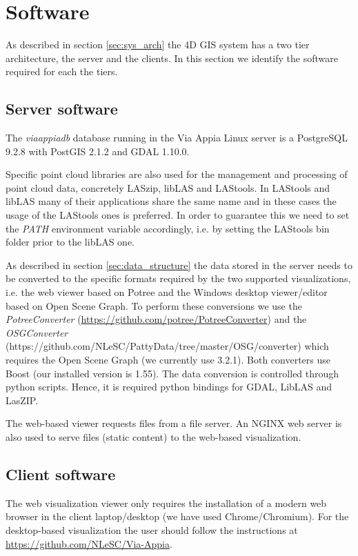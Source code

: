 \section{Software}
\label{sec:software}
As described in section \ref{sec:sys_arch} the 4D GIS system has a two tier
architecture, the server and the clients. In this section we identify the software
required for each the tiers.

\subsection{Server software}
The \textit{viaappiadb} database running in the Via Appia Linux server is a
PostgreSQL 9.2.8 with PostGIS 2.1.2 and GDAL 1.10.0.

Specific point cloud libraries are also used for the management and processing
of point cloud data, concretely LASzip, libLAS and LAStools. In LAStools and
libLAS many of their applications share the same name and in these cases the
usage of the LAStools ones is preferred. In order to guarantee this we need to
set the \textit{PATH} environment variable accordingly, i.e. by setting the
LAStools bin folder prior to the libLAS one.

As described in section \ref{sec:data_structure} the data stored in the server
needs to be converted to the specific formats required by the two supported
visualizations, i.e. the web viewer based on Potree and the Windows desktop
viewer/editor based on Open Scene Graph. To perform these conversions we use
the \textit{PotreeConverter} ({\url{https://github.com/potree/PotreeConverter}}) and
the \textit{OSGConverter}
(https://github.com/NLeSC/PattyData/tree/master/OSG/converter) which requires the
Open Scene Graph (we currently use 3.2.1). Both converters use Boost (our
installed version is 1.55). The data conversion is controlled through python
scripts. Hence, it is required python bindings for GDAL, LibLAS and LasZIP. 

The web-based viewer requests files from a file server. An NGINX web server is
also used to serve files (static content) to the web-based visualization.

\subsection{Client software}
The web visualization viewer only requires the installation of a modern web
browser in the client laptop/desktop (we have used Chrome/Chromium). For the
desktop-based visualization the user should follow the instructions
at {\url{https://github.com/NLeSC/Via-Appia}}.
